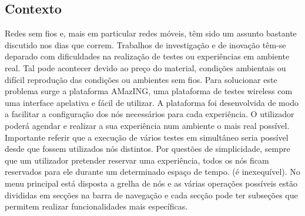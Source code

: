 \subsection{Contexto}
Redes sem fios e, mais em particular redes móveis, têm sido um assunto bastante discutido nos dias que correm. Trabalhos de investigação e de inovação têm-se deparado com dificuldades na realização de testes ou experiências em ambiente real. Tal pode acontecer devido ao preço do material, condições ambientais ou difícil reprodução das condições ou ambientes sem fios. Para solucionar este problema surge a plataforma AMazING, uma plataforma de testes wireless com uma interface apelativa e fácil de utilizar. \newline
A plataforma foi desenvolvida de modo a facilitar a configuração dos nós necessários para cada experiência. O utilizador poderá agendar e realizar a sua experiência num ambiente o mais real possível. Importante referir que a execução de vários testes em simultâneo seria possível desde que fossem utilizados nós distintos. Por questões de simplicidade, sempre que um utilizador pretender reservar uma experiência, todos os nós ficam reservados para ele durante um determinado espaço de tempo. (é inexequível).
No menu principal está disposta a grelha de nós e as várias operações possíveis estão divididas em secções na barra de navegação e cada secção pode ter subseções que permitem realizar funcionalidades mais específicas.


